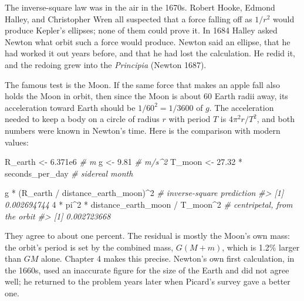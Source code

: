 \documentclass[
  10.5pt,
  letterpaper,
]{scrbook}
\newenvironment{Shaded}{\begin{snugshade}}{\end{snugshade}}
\newcommand{\CommentTok}[1]{\textcolor[rgb]{0.00,0.00,0.00}{\textit{#1}}}
\newcommand{\DecValTok}[1]{\textcolor[rgb]{0.00,0.00,0.00}{#1}}
\newcommand{\FloatTok}[1]{\textcolor[rgb]{0.00,0.00,0.00}{#1}}
\newcommand{\NormalTok}[1]{\textcolor[rgb]{0.00,0.00,0.00}{#1}}
\newcommand{\OtherTok}[1]{\textcolor[rgb]{0.00,0.00,0.00}{#1}}
\newcommand{\SpecialCharTok}[1]{\textcolor[rgb]{0.00,0.00,0.00}{#1}}
\newcounter{none} %
\theoremstyle{plain}
\theoremstyle{remark}
\begin{document}
\begin{tcolorbox}[enhanced jigsaw, arc=.35mm, bottomrule=.15mm, bottomtitle=1mm, breakable, colback=white, colbacktitle=quarto-callout-note-color!10!white, colframe=quarto-callout-note-color-frame, coltitle=black, left=2mm, leftrule=.75mm, opacityback=0, opacitybacktitle=0.6, rightrule=.15mm, title={Where it comes from}, titlerule=0mm, toprule=.15mm, toptitle=1mm]

The inverse-square law was in the air in the 1670s. Robert Hooke, Edmond
Halley, and Christopher Wren all suspected that a force falling off as
\(1/r^2\) would produce Kepler's ellipses; none of them could prove it.
In 1684 Halley asked Newton what orbit such a force would produce.
Newton said an ellipse, that he had worked it out years before, and that
he had lost the calculation. He redid it, and the redoing grew into the
\emph{Principia} (Newton 1687).

The famous test is the Moon. If the same force that makes an apple fall
also holds the Moon in orbit, then since the Moon is about 60 Earth
radii away, its acceleration toward Earth should be \(1/60^2 = 1/3600\)
of \(g\). The acceleration needed to keep a body on a circle of radius
\(r\) with period \(T\) is \(4\pi^2 r/T^2\), and both numbers were known
in Newton's time. Here is the comparison with modern values:

\begin{Shaded}
\begin{Highlighting}[]
\NormalTok{R\_earth }\OtherTok{\textless{}{-}} \FloatTok{6.371e6}                           \CommentTok{\# m}
\NormalTok{g       }\OtherTok{\textless{}{-}} \FloatTok{9.81}                              \CommentTok{\# m/s\^{}2}
\NormalTok{T\_moon  }\OtherTok{\textless{}{-}} \FloatTok{27.32} \SpecialCharTok{*}\NormalTok{ seconds\_per\_day           }\CommentTok{\# sidereal month}

\NormalTok{g }\SpecialCharTok{*}\NormalTok{ (R\_earth }\SpecialCharTok{/}\NormalTok{ distance\_earth\_moon)}\SpecialCharTok{\^{}}\DecValTok{2}        \CommentTok{\# inverse{-}square prediction}
\CommentTok{\#\textgreater{} [1] 0.002694744}
\DecValTok{4} \SpecialCharTok{*}\NormalTok{ pi}\SpecialCharTok{\^{}}\DecValTok{2} \SpecialCharTok{*}\NormalTok{ distance\_earth\_moon }\SpecialCharTok{/}\NormalTok{ T\_moon}\SpecialCharTok{\^{}}\DecValTok{2}    \CommentTok{\# centripetal, from the orbit}
\CommentTok{\#\textgreater{} [1] 0.002723668}
\end{Highlighting}
\end{Shaded}

They agree to about one percent. The residual is mostly the Moon's own
mass: the orbit's period is set by the combined mass, \(G(M+m)\), which
is 1.2\% larger than \(GM\) alone. Chapter 4 makes this precise.
Newton's own first calculation, in the 1660s, used an inaccurate figure
for the size of the Earth and did not agree well; he returned to the
problem years later when Picard's survey gave a better one.

\end{tcolorbox}
\end{document}
